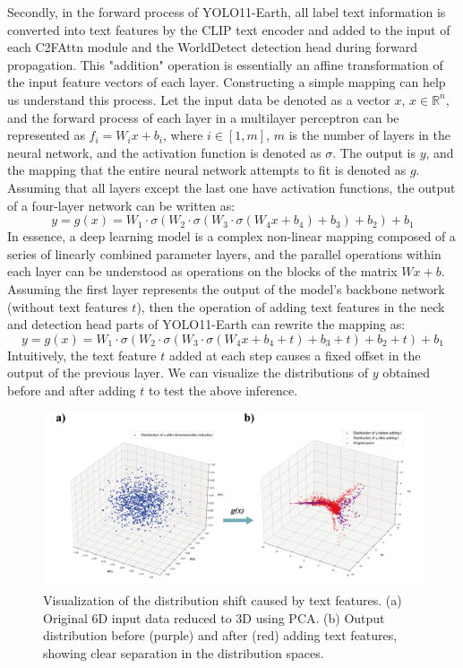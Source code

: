 \documentclass{article}
\begin{document}
Secondly, in the forward process of YOLO11-Earth, all label text information is converted into text 
features by the CLIP text encoder and added to the input of each C2FAttn module and the WorldDetect detection 
head during forward propagation. This "addition" operation is essentially an affine transformation of the input 
feature vectors of each layer. Constructing a simple mapping can help us understand this process. Let the 
input data be denoted as a vector $x$, $x \in \mathbb{R}^n$, and the forward process of each layer in a 
multilayer perceptron can be represented as $f_i = W_i x + b_i$, where $i \in [1, m]$, $m$ is the number of 
layers in the neural network, and the activation function is denoted as $\sigma$. The output is $y$, and the 
mapping that the entire neural network attempts to fit is denoted as $g$. Assuming that all layers except the 
last one have activation functions, the output of a four-layer network can be written as:
\begin{equation}
y = g(x) = W_1 \cdot \sigma(W_2 \cdot \sigma(W_3 \cdot \sigma(W_4 x + b_4) + b_3) + b_2) + b_1
\end{equation}
In essence, a deep learning model is a complex non-linear mapping composed of a series of linearly combined 
parameter layers, and the parallel operations within each layer can be understood as operations on the blocks 
of the matrix $Wx+b$. Assuming the first layer represents the output of the model's backbone network (without 
text features $t$), then the operation of adding text features in the neck and detection head parts of 
YOLO11-Earth can rewrite the mapping as:
\begin{equation}
y = g(x) = W_1 \cdot \sigma(W_2 \cdot \sigma(W_3 \cdot \sigma(W_4 x + b_4 + t) + b_3 + t) + b_2 + t) + b_1
\end{equation}
Intuitively, the text feature $t$ added at each step causes a fixed offset in the output of the previous layer. 
We can visualize the distributions of $y$ obtained before and after adding $t$ to test the above inference.
\begin{figure}[htbp]
    \centering
    \includegraphics[width=12cm]{../image/9.png}
    \caption{Visualization of the distribution shift caused by text features. (a) Original 6D input data 
    reduced to 3D using PCA. (b) Output distribution before (purple) and after (red) adding text features, 
    showing clear separation in the distribution spaces.}
    \label{fig:distribution-shift}
\end{figure}
\end{document}
